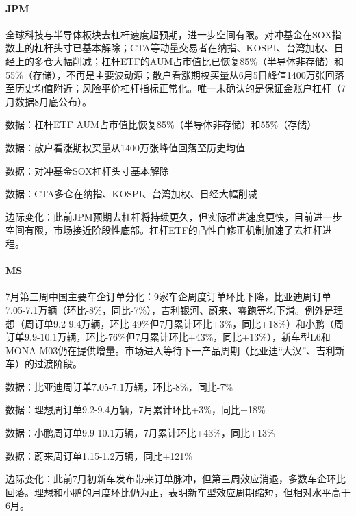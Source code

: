 \documentclass[11pt]{ctexart}
\begin{document}
\paragraph{JPM} 全球科技与半导体板块去杠杆速度超预期，进一步空间有限。对冲基金在SOX指数上的杠杆头寸已基本解除；CTA等动量交易者在纳指、KOSPI、台湾加权、日经上的多仓大幅削减；杠杆ETF的AUM占市值比已恢复85\%（半导体非存储）和55\%（存储），不再是主要波动源；散户看涨期权买量从6月5日峰值1400万张回落至历史均值附近；风险平价杠杆指标正常化。唯一未确认的是保证金账户杠杆（7月数据8月底公布）。
{\small\color{refgray}数据：杠杆ETF AUM占市值比恢复85\%（半导体非存储）和55\%（存储）\par}
{\small\color{refgray}数据：散户看涨期权买量从1400万张峰值回落至历史均值\par}
{\small\color{refgray}数据：对冲基金SOX杠杆头寸基本解除\par}
{\small\color{refgray}数据：CTA多仓在纳指、KOSPI、台湾加权、日经大幅削减\par}
{\small\color{refgray}边际变化：此前JPM预期去杠杆将持续更久，但实际推进速度更快，目前进一步空间有限，市场接近阶段性底部。杠杆ETF的凸性自修正机制加速了去杠杆进程。\par}
\paragraph{MS} 7月第三周中国主要车企订单分化：9家车企周度订单环比下降，比亚迪周订单7.05-7.1万辆（环比-8\%，同比-7\%），吉利银河、蔚来、零跑等均下滑。例外是理想（周订单9.2-9.4万辆，环比-49\%但7月累计环比+3\%，同比+18\%）和小鹏（周订单9.9-10.1万辆，环比-76\%但7月累计环比+43\%，同比+13\%），新车型L6和MONA M03仍在提供增量。市场进入等待下一产品周期（比亚迪“大汉”、吉利新车）的过渡阶段。
{\small\color{refgray}数据：比亚迪周订单7.05-7.1万辆，环比-8\%，同比-7\%\par}
{\small\color{refgray}数据：理想周订单9.2-9.4万辆，7月累计环比+3\%，同比+18\%\par}
{\small\color{refgray}数据：小鹏周订单9.9-10.1万辆，7月累计环比+43\%，同比+13\%\par}
{\small\color{refgray}数据：蔚来周订单1.15-1.2万辆，同比+121\%\par}
{\small\color{refgray}边际变化：此前7月初新车发布带来订单脉冲，但第三周效应消退，多数车企环比回落。理想和小鹏的月度环比仍为正，表明新车型效应周期缩短，但相对水平高于6月。\par}
\end{document}
